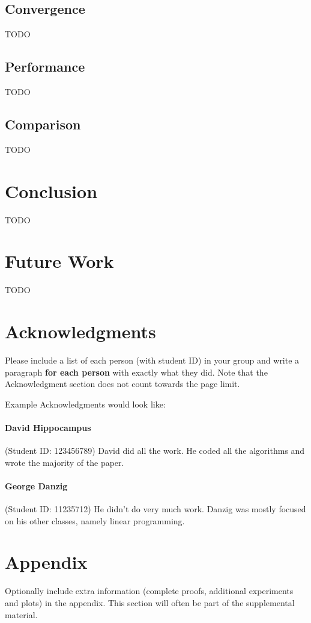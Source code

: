 \documentclass{article}
\begin{document}
\subsection{Convergence}
TODO
\subsection{Performance}
TODO
\subsection{Comparison}
TODO

\section{Conclusion}
TODO

\section{Future Work}
TODO


\newpage

\section*{Acknowledgments}
Please include a list of each person (with student ID) in your group
and write a paragraph \textbf{for each person} with exactly what they
did. Note that the Acknowledgment section does not count towards the
page limit.

Example Acknowledgments would look like:

\paragraph{David Hippocampus} (Student ID: 123456789) David did all
the work. He coded all the algorithms and wrote the majority of the
paper.

\paragraph{George Danzig} (Student ID: 11235712) He didn't do very
much work. Danzig was mostly focused on his other classes, namely
linear programming. 





\medskip





\appendix


\section{Appendix}


Optionally include extra information (complete proofs, additional experiments and plots) in the appendix.
This section will often be part of the supplemental material.
\end{document}
